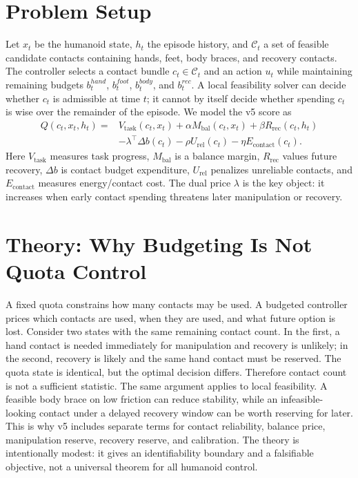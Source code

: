 \documentclass{article}
\begin{document}
\section{Problem Setup}
Let $x_t$ be the humanoid state, $h_t$ the episode history, and $\mathcal{C}_t$ a set of feasible candidate contacts containing hands, feet, body braces, and recovery contacts. The controller selects a contact bundle $c_t \in \mathcal{C}_t$ and an action $u_t$ while maintaining remaining budgets $b_t^{hand}$, $b_t^{foot}$, $b_t^{body}$, and $b_t^{rec}$. A local feasibility solver can decide whether $c_t$ is admissible at time $t$; it cannot by itself decide whether spending $c_t$ is wise over the remainder of the episode.
We model the v5 score as
\[
\begin{aligned}
Q(c_t,x_t,h_t) ={}& V_{\mathrm{task}}(c_t,x_t)
+ \alpha M_{\mathrm{bal}}(c_t,x_t)
+ \beta R_{\mathrm{rec}}(c_t,h_t) \\
&- \lambda^\top \Delta b(c_t)
- \rho U_{\mathrm{rel}}(c_t)
- \eta E_{\mathrm{contact}}(c_t).
\end{aligned}
\]
Here $V_{\mathrm{task}}$ measures task progress, $M_{\mathrm{bal}}$ is a balance margin, $R_{\mathrm{rec}}$ values future recovery, $\Delta b$ is contact budget expenditure, $U_{\mathrm{rel}}$ penalizes unreliable contacts, and $E_{\mathrm{contact}}$ measures energy/contact cost. The dual price $\lambda$ is the key object: it increases when early contact spending threatens later manipulation or recovery.
\section{Theory: Why Budgeting Is Not Quota Control}
A fixed quota constrains how many contacts may be used. A budgeted controller prices which contacts are used, when they are used, and what future option is lost. Consider two states with the same remaining contact count. In the first, a hand contact is needed immediately for manipulation and recovery is unlikely; in the second, recovery is likely and the same hand contact must be reserved. The quota state is identical, but the optimal decision differs. Therefore contact count is not a sufficient statistic.
The same argument applies to local feasibility. A feasible body brace on low friction can reduce stability, while an infeasible-looking contact under a delayed recovery window can be worth reserving for later. This is why v5 includes separate terms for contact reliability, balance price, manipulation reserve, recovery reserve, and calibration. The theory is intentionally modest: it gives an identifiability boundary and a falsifiable objective, not a universal theorem for all humanoid control.
\end{document}
